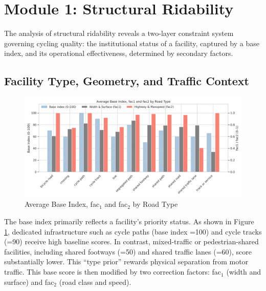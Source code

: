 \documentclass[
  12pt,
  oneside]{book}
\begin{document}
\section{Module 1: Structural Ridability}\label{module-1-structural-ridability}

The analysis of structural ridability reveals a two-layer constraint system governing cycling quality: the institutional status of a facility, captured by a base index, and its operational effectiveness, determined by secondary factors.

\subsection{Facility Type, Geometry, and Traffic Context}\label{facility-type-geometry-and-traffic-context}

\begin{figure}

{\centering \includegraphics[width=0.95\linewidth]{general_images/fac1_2} 

}

\caption{Average Base Index, fac$_1$ and fac$_2$ by Road Type}\label{fig:fac12}
\end{figure}

The base index primarily reflects a facility's priority status. As shown in Figure \ref{fig:fac12}, dedicated infrastructure such as cycle paths (base index =100) and cycle tracks (=90) receive high baseline scores. In contrast, mixed-traffic or pedestrian-shared facilities, including shared footways (=50) and shared traffic lanes (=60), score substantially lower. This ``type prior'' rewards physical separation from motor traffic. This base score is then modified by two correction factors: fac\(_1\) (width and surface) and fac\(_2\) (road class and speed).
\end{document}
